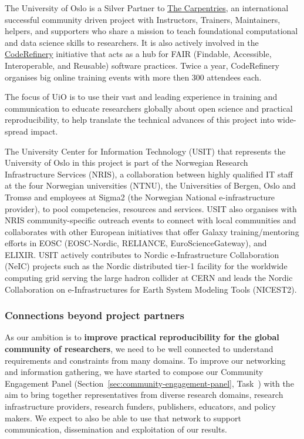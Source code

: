 The University of Oslo is a Silver Partner to \href{https://carpentries.org}{The
  Carpentries}, an international successful community driven project with
Instructors, Trainers, Maintainers, helpers, and supporters who share a mission
to teach foundational computational and data science skills to researchers. It
is also actively involved in the \href{https://coderefinery.org/}{CodeRefinery}
initiative that acts as a hub for FAIR (Findable, Accessible, Interoperable, and
Reusable) software practices. Twice a year, CodeRefinery organises big online
training events with more then 300 attendees each.

The focus of UiO is to use their vast and leading experience in training
and communication to educate researchers globally about open science and
practical reproducibility, to help translate the technical advances of this
project into wide-spread impact.

The University Center for Information Technology (USIT) that represents the University of Oslo in this 
project is part of the Norwegian Research Infrastructure Services (NRIS), 
a collaboration between highly qualified IT staff at the four Norwegian universities (NTNU), the 
Universities of Bergen, Oslo and Tromsø and employees at Sigma2 (the Norwegian National e-infrastructure provider),
 to pool competencies, resources and services. USIT also organises with NRIS
 community-specific outreach events to connect with local communities and collaborates with other European 
 initiatives that offer Galaxy training/mentoring efforts in EOSC (EOSC-Nordic, RELIANCE, EuroScienceGateway), 
 and ELIXIR. USIT actively contributes to Nordic e-Infrastructure Collaboration (NeIC) projects such as the Nordic distributed tier-1 facility for the worldwide computing 
 grid serving the large hadron collider at CERN and
 leads the Nordic Collaboration on e-Infrastructures for Earth System Modeling Tools (NICEST2).

\subsubsection{Connections beyond project partners}

As our ambition is to \textbf{improve practical reproducibility for the global
  community of researchers}, we need to be well connected to understand
requirements and constraints from many domains. To improve our networking and
information gathering, we have started to compose our Community Engagement Panel
(Section~\ref{sec:community-engagement-panel},
Task~)
with the aim to bring together
representatives from diverse research domains, research infrastructure
providers, research funders, publishers, educators, and policy makers. We expect
to also be able to use that network to support communication, dissemination and
exploitation of our results.

